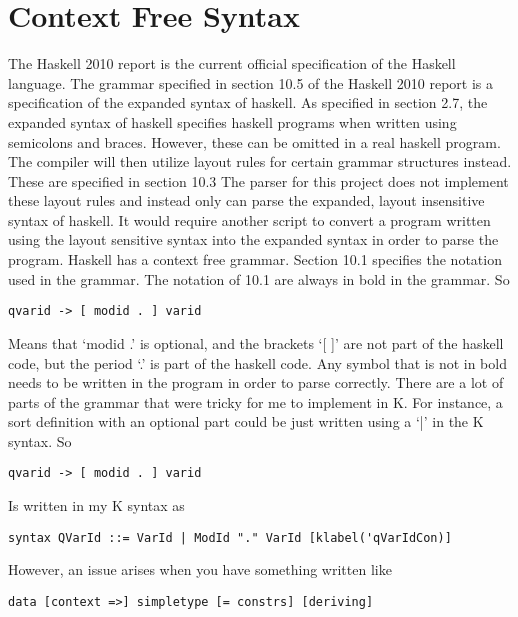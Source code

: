 \chapter{Context Free Syntax}
The Haskell 2010 report is the current official specification of the Haskell language. %
The grammar specified in section 10.5 of the Haskell 2010 report is a specification of the expanded syntax of haskell.
As specified in section 2.7, the expanded syntax of haskell specifies haskell programs when written using semicolons and braces. However, these can be omitted in a real haskell program. The compiler will then utilize layout rules for certain grammar structures instead. These are specified in section 10.3
The parser for this project does not implement these layout rules and instead only can parse the expanded, layout insensitive syntax of haskell. It would require another script to convert a program written using the layout sensitive syntax into the expanded syntax in order to parse the program.
Haskell has a context free grammar.
	Section 10.1 specifies the notation used in the grammar.
The notation of 10.1 are always in bold in the grammar. So
\begin{lstlisting}
qvarid -> [ modid . ] varid
\end{lstlisting}
Means that ‘modid .’ is optional, and the brackets ‘[ ]’ are not part of the haskell code, but the period ‘.’ is part of the haskell code. Any symbol that is not in bold needs to be written in the program in order to parse correctly.
There are a lot of parts of the grammar that were tricky for me to implement in K. For instance, a sort definition with an optional part could be just written using a ‘|’ in the K syntax. So 
\begin{lstlisting}
qvarid -> [ modid . ] varid
\end{lstlisting}
Is written in my K syntax as
\begin{lstlisting}
syntax QVarId ::= VarId | ModId "." VarId [klabel('qVarIdCon)]
\end{lstlisting}
However, an issue arises when you have something written like
\begin{lstlisting}
data [context =>] simpletype [= constrs] [deriving]
\end{lstlisting}
